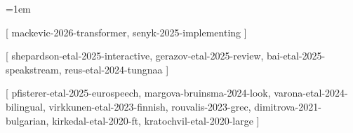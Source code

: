 \documentclass[a4paper, 12pt]{article}
\title{%
  \trans{%
    Списък на цитиранията%
  }{%
    List of Citations%
  }
}
\date{}
\author{}
\begin{document}
  \maketitle

  \emergencystretch=1em

  \begin{pubenumerate}


    [
      mackevic-2026-transformer,
      senyk-2025-implementing
    ]

    [
      shepardson-etal-2025-interactive,
      gerazov-etal-2025-review,
      bai-etal-2025-speakstream,
      reus-etal-2024-tungnaa
    ]



    [
      pfisterer-etal-2025-eurospeech,
      margova-bruinsma-2024-look,
      varona-etal-2024-bilingual,
      virkkunen-etal-2023-finnish,
      rouvalis-2023-grec,
      dimitrova-2021-bulgarian,
      kirkedal-etal-2020-ft,
      kratochvil-etal-2020-large
    ]

  \end{pubenumerate}
\end{document}

